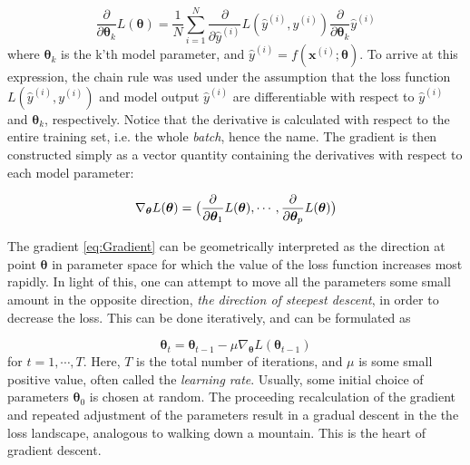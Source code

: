 \begin{equation}\label{eq:LossDerivateWRTparameter}
    \frac{\partial}{\partial \boldsymbol{\theta}_k} L(\boldsymbol{\theta}) =
    \frac{1}{N}\sum_{i=1}^{N} \frac{\partial}{\partial \hat{y}^{(i)}} L( \hat{y}^{(i)}, y^{(i)})
    \frac{\partial}{\partial \boldsymbol{\theta}_k}\hat{y}^{(i)}
\end{equation}
where $\boldsymbol{\theta}_k$ is the k'th model parameter, and  $\hat{y}^{(i)} = f(\boldsymbol{x}^{(i)}; \boldsymbol{\theta})$. To arrive at this expression, the chain rule was used under the assumption that the loss function $L(\hat{y}^{(i)}, y^{(i)})$ and model output $\hat{y}^{(i)}$ are differentiable with respect to $\hat{y}^{(i)}$ and $\boldsymbol{\theta}_k$, respectively. Notice that the derivative is calculated with respect to the entire training set, i.e. the whole \emph{batch}, hence the name. The gradient is then constructed simply as a vector quantity containing the derivatives with respect to each model parameter:

\begin{equation}\label{eq:Gradient}
    \nabla_{\boldsymbol{\theta}} L(\boldsymbol{\theta})= 
    \big{(} \frac{\partial}{\partial \boldsymbol{\theta}_1} L(\boldsymbol{\theta}), 
    \cdots, \frac{\partial}{\partial \boldsymbol{\theta}_p} L(\boldsymbol{\theta}) \big{)}
\end{equation}

The gradient \autoref{eq:Gradient} can be geometrically interpreted as the direction at point $\boldsymbol{\theta}$ in parameter space for which the value of the loss function increases most rapidly. In light of this, one can attempt to move all the parameters some small amount in the opposite direction, \emph{the direction of steepest descent}, in order to decrease the loss. This can be done iteratively, and can be formulated as 


\begin{equation}\label{eq:ParameterUpdate}
    \boldsymbol{\theta}_{t} = \boldsymbol{\theta}_{t-1} - \mu \nabla_{\boldsymbol{\theta}} L(\boldsymbol{\theta}_{t-1})
\end{equation}
for $t=1, \cdots, T$. Here, $T$ is the total number of iterations, and $\mu$ is some small positive value, often called the \emph{learning rate}. Usually, some initial choice of parameters $\boldsymbol{\theta}_{0}$ is chosen at random. The proceeding recalculation of the gradient and repeated adjustment of the parameters result in a gradual descent in the the loss landscape, analogous to walking down a mountain. This is the heart of gradient descent.

